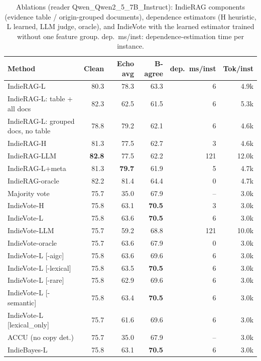 \begin{table}[tbp]
\centering
\small
\caption{Ablations (reader Qwen\_Qwen2\_5\_7B\_Instruct): IndieRAG components (evidence table / origin-grouped documents), dependence estimators (H heuristic, L learned, LLM judge, oracle), and IndieVote with the learned estimator trained without one feature group. dep.\ ms/inst: dependence-estimation time per instance.}
\label{tab:ablation}
\setlength{\tabcolsep}{4pt}
\begin{tabular}{lrrrrr}
\toprule
Method & Clean & Echo avg & B-agree & dep.\ ms/inst & Tok/inst \\
\midrule
IndieRAG-L & 80.3 & 78.3 & 63.3 & 6 & 4.9k \\
IndieRAG-L: table + all docs & 82.3 & 62.5 & 61.5 & 6 & 5.3k \\
IndieRAG-L: grouped docs, no table & 78.8 & 79.2 & 62.1 & 6 & 4.6k \\
IndieRAG-H & 81.3 & 77.5 & 62.7 & 3 & 4.6k \\
IndieRAG-LLM & \textbf{82.8} & 77.5 & 62.2 & 121 & 12.0k \\
IndieRAG-L+meta & 81.3 & \textbf{79.7} & 61.9 & 5 & 4.7k \\
IndieRAG-oracle & 82.2 & 81.4 & 64.4 & 0 & 4.7k \\
\midrule
Majority vote & 75.7 & 35.0 & 67.9 & -- & 3.0k \\
IndieVote-H & 75.8 & 63.1 & \textbf{70.5} & 3 & 3.0k \\
IndieVote-L & 75.8 & 63.6 & \textbf{70.5} & 6 & 3.0k \\
IndieVote-LLM & 75.7 & 59.2 & 68.8 & 121 & 10.0k \\
IndieVote-oracle & 75.7 & 63.6 & 67.9 & 0 & 3.0k \\
IndieVote-L [-aigc] & 75.8 & 63.6 & 69.6 & 6 & 3.0k \\
IndieVote-L [-lexical] & 75.8 & 63.5 & \textbf{70.5} & 6 & 3.0k \\
IndieVote-L [-rare] & 75.8 & 62.9 & 69.6 & 6 & 3.0k \\
IndieVote-L [-semantic] & 75.8 & 63.4 & \textbf{70.5} & 6 & 3.0k \\
IndieVote-L [lexical\_only] & 75.7 & 61.6 & 69.6 & 6 & 3.0k \\
\midrule
ACCU (no copy det.) & 75.7 & 35.0 & 67.9 & -- & 3.0k \\
IndieBayes-L & 75.8 & 63.1 & \textbf{70.5} & 6 & 3.0k \\
\bottomrule
\end{tabular}
\end{table}
